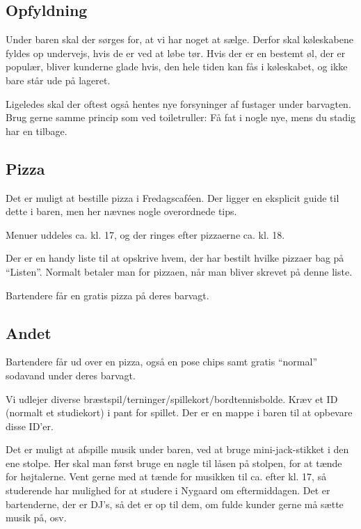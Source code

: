 \subsection{Opfyldning}
\label{sec:intra:opfyldning}

Under baren skal der sørges for, at vi har noget at sælge. Derfor skal
køleskabene fyldes op undervejs, hvis de er ved at løbe tør. Hvis der
er en bestemt øl, der er populær, bliver kunderne glade hvis, den hele
tiden kan fås i køleskabet, og ikke bare står ude på lageret.

Ligeledes skal der oftest også hentes nye forsyninger af fustager
under barvagten. Brug gerne samme princip som ved toiletruller: Få fat
i nogle nye, mens du stadig har en tilbage.

\subsection{Pizza}
\label{sec:intra:pizza}

Det er muligt at bestille pizza i Fredagscaféen. Der ligger en
eksplicit guide til dette i baren, men her nævnes nogle overordnede tips.

Menuer uddeles ca. kl. 17, og der ringes efter pizzaerne ca. kl. 18.

Der er en handy liste til at opskrive hvem, der har bestilt hvilke
pizzaer bag på ``Listen''. Normalt betaler man for pizzaen, når man
bliver skrevet på denne liste.

Bartendere får en gratis pizza på deres barvagt.

\subsection{Andet}
\label{sec:intra:andet}

Bartendere får ud over en pizza, også en pose chips samt gratis
``normal'' sodavand under deres barvagt.

Vi udlejer diverse
bræstspil/terninger/spillekort/bordtennisbolde. Kræv et ID (normalt et
studiekort) i pant for spillet. Der er en mappe i baren til at
opbevare disse ID'er.

Det er muligt at afspille musik under baren, ved at bruge
mini-jack-stikket i den ene stolpe. Her skal man først bruge en nøgle
til låsen på stolpen, for at tænde for højtalerne. Vent gerne med at
tænde for musikken til ca. efter kl. 17, så studerende har mulighed
for at studere i Nygaard om eftermiddagen. Det er bartenderne, der er
DJ's, så det er op til dem, om fulde kunder gerne må sætte musik på,
osv.

